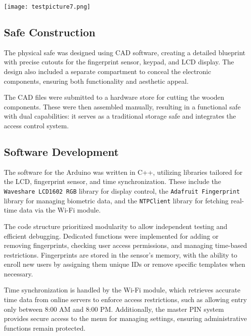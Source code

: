 \documentclass{article}
\begin{document}
    \begin{center}
         \texttt{[image: testpicture7.png]} 
         \\[0.5cm] 
    \end{center}

\subsection{Safe Construction}
The physical safe was designed using CAD software, creating a detailed blueprint with precise cutouts for the fingerprint sensor, keypad, and LCD display. The design also included a separate compartment to conceal the electronic components, ensuring both functionality and aesthetic appeal.

The CAD files were submitted to a hardware store for cutting the wooden components. These were then assembled manually, resulting in a functional safe with dual capabilities: it serves as a traditional storage safe and integrates the access control system.

\subsection{Software Development}
The software for the Arduino was written in C++, utilizing libraries tailored for the LCD, fingerprint sensor, and time synchronization. These include the \texttt{Waveshare LCD1602 RGB} library for display control, the \texttt{Adafruit Fingerprint} library for managing biometric data, and the \texttt{NTPClient} library for fetching real-time data via the Wi-Fi module.

The code structure prioritized modularity to allow independent testing and efficient debugging. Dedicated functions were implemented for adding or removing fingerprints, checking user access permissions, and managing time-based restrictions. Fingerprints are stored in the sensor's memory, with the ability to enroll new users by assigning them unique IDs or remove specific templates when necessary.

Time synchronization is handled by the Wi-Fi module, which retrieves accurate time data from online servers to enforce access restrictions, such as allowing entry only between 8:00 AM and 8:00 PM. Additionally, the master PIN system provides secure access to the menu for managing settings, ensuring administrative functions remain protected.
\end{document}
